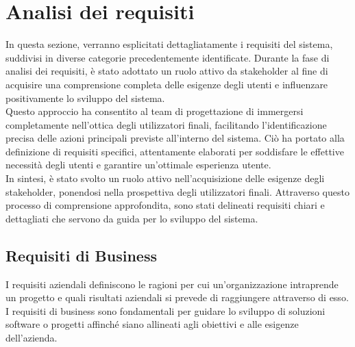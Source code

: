
\section{Analisi dei requisiti}
In questa sezione, verranno esplicitati dettagliatamente i requisiti del sistema,
suddivisi in diverse categorie precedentemente identificate. Durante la fase di
analisi dei requisiti, è stato adottato un ruolo attivo da stakeholder al fine di
acquisire una comprensione completa delle esigenze degli utenti e influenzare positivamente
lo sviluppo del sistema.\\

Questo approccio ha consentito al team di progettazione di immergersi completamente
nell'ottica degli utilizzatori finali, facilitando l'identificazione precisa delle
azioni principali previste all'interno del sistema. Ciò ha portato alla definizione di requisiti specifici, attentamente elaborati per soddisfare le effettive necessità degli utenti e garantire un'ottimale esperienza utente.\\

In sintesi, è stato svolto un ruolo attivo nell'acquisizione delle esigenze degli
stakeholder, ponendosi nella prospettiva degli utilizzatori finali. Attraverso
questo processo di comprensione approfondita, sono stati delineati requisiti
chiari e dettagliati che servono da guida per lo sviluppo del sistema.

\subsection{Requisiti di Business}
I requisiti aziendali definiscono le ragioni per cui un'organizzazione intraprende un progetto e quali risultati aziendali si prevede di raggiungere attraverso di esso. I requisiti di business sono fondamentali per guidare lo sviluppo di soluzioni software o progetti affinché siano allineati agli obiettivi e alle esigenze dell'azienda.

